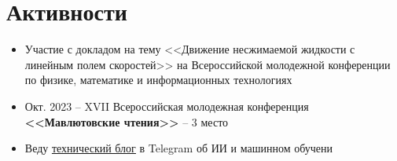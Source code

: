 \section{Активности}
\begin{itemize} %
	\item Участие с докладом на тему <<Движение несжимаемой жидкости с линейным полем скоростей>> на Всероссийской молодежной конференции по физике, математике и информационных технологиях
	\item Окт. 2023 – XVII Всероссийская молодежная конференция \textbf{<<Мавлютовские чтения>>} – 3 место
	\item Веду \underline{\href{https://t.me/in_ai_fog}{технический блог}} в Telegram об ИИ и машинном обучени
\end{itemize} %
